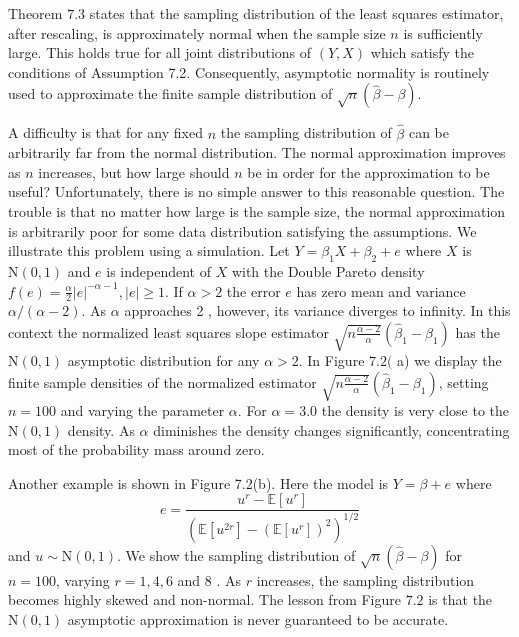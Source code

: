 \documentclass[10pt]{article}
\begin{document}
Theorem $7.3$ states that the sampling distribution of the least squares estimator, after rescaling, is approximately normal when the sample size $n$ is sufficiently large. This holds true for all joint distributions of $(Y, X)$ which satisfy the conditions of Assumption 7.2. Consequently, asymptotic normality is routinely used to approximate the finite sample distribution of $\sqrt{n}(\widehat{\beta}-\beta)$.

A difficulty is that for any fixed $n$ the sampling distribution of $\widehat{\beta}$ can be arbitrarily far from the normal distribution. The normal approximation improves as $n$ increases, but how large should $n$ be in order for the approximation to be useful? Unfortunately, there is no simple answer to this reasonable question. The trouble is that no matter how large is the sample size, the normal approximation is arbitrarily poor for some data distribution satisfying the assumptions. We illustrate this problem using a simulation. Let $Y=\beta_{1} X+\beta_{2}+e$ where $X$ is $\mathrm{N}(0,1)$ and $e$ is independent of $X$ with the Double Pareto density $f(e)=\frac{\alpha}{2}|e|^{-\alpha-1},|e| \geq 1$. If $\alpha>2$ the error $e$ has zero mean and variance $\alpha /(\alpha-2)$. As $\alpha$ approaches 2 , however, its variance diverges to infinity. In this context the normalized least squares slope estimator $\sqrt{n \frac{\alpha-2}{\alpha}}\left(\widehat{\beta}_{1}-\beta_{1}\right)$ has the $\mathrm{N}(0,1)$ asymptotic distribution for any $\alpha>2$. In Figure $7.2($ a) we display the finite sample densities of the normalized estimator $\sqrt{n \frac{\alpha-2}{\alpha}}\left(\widehat{\beta}_{1}-\beta_{1}\right)$, setting $n=100$ and varying the parameter $\alpha$. For $\alpha=3.0$ the density is very close to the $\mathrm{N}(0,1)$ density. As $\alpha$ diminishes the density changes significantly, concentrating most of the probability mass around zero.

Another example is shown in Figure 7.2(b). Here the model is $Y=\beta+e$ where
$$
e=\frac{u^{r}-\mathbb{E}\left[u^{r}\right]}{\left(\mathbb{E}\left[u^{2 r}\right]-\left(\mathbb{E}\left[u^{r}\right]\right)^{2}\right)^{1 / 2}}
$$
and $u \sim \mathrm{N}(0,1)$. We show the sampling distribution of $\sqrt{n}(\widehat{\beta}-\beta)$ for $n=100$, varying $r=1,4,6$ and 8 . As $r$ increases, the sampling distribution becomes highly skewed and non-normal. The lesson from Figure $7.2$ is that the $\mathrm{N}(0,1)$ asymptotic approximation is never guaranteed to be accurate.
\end{document}
